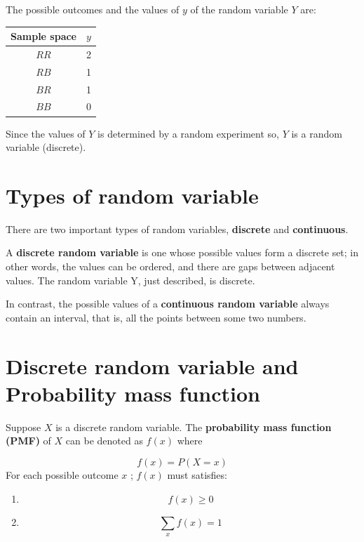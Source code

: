 \documentclass[
  11pt,
  letterpaper,
  DIV=11,
  numbers=noendperiod]{scrreprt}
\begin{document}
The possible outcomes and the values of \(y\) of the random variable
\(Y\) are:

\begin{longtable}[]{@{}cc@{}}
\toprule\noalign{}
\textbf{Sample space} & \(y\) \\
\midrule\noalign{}
\endhead
\bottomrule\noalign{}
\endlastfoot
\(RR\) & 2 \\
\(RB\) & 1 \\
\(BR\) & 1 \\
\(BB\) & 0 \\
\end{longtable}

Since the values of \(Y\) is determined by a random experiment so, \(Y\)
is a random variable (discrete).

\section{\texorpdfstring{\textbf{Types of random
variable}}{Types of random variable}}\label{sec-types-of-random-variable}

There are two important types of random variables, \textbf{discrete} and
\textbf{continuous}.

A \textbf{discrete random variable} is one whose possible values form a
discrete set; in other words, the values can be ordered, and there are
gaps between adjacent values. The random variable Y, just described, is
discrete.

In contrast, the possible values of a \textbf{continuous random
variable} always contain an interval, that is, all the points between
some two numbers.

\section{Discrete random variable and Probability mass
function}\label{discrete-random-variable-and-probability-mass-function}

Suppose \(X\) is a discrete random variable. The \textbf{probability
mass function (PMF)} of \(X\) can be denoted as \(f(x)\) where

\[f(x)=P(X=x)\] For each possible outcome \(x\) ; \(f(x)\) must
satisfies:

\begin{enumerate}
\def\labelenumi{\arabic{enumi}.}
\item
  \[f(x) \ge 0\]
\item
  \[\sum _x f(x)=1\]
\end{enumerate}
\end{document}
